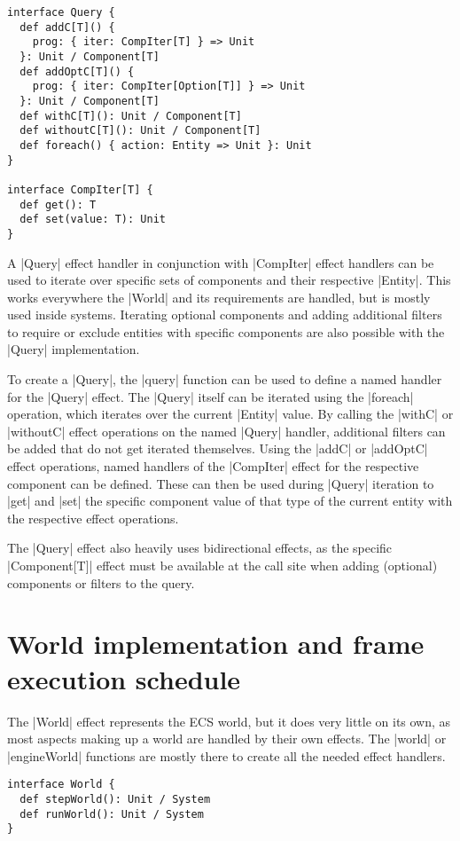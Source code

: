 \begin{lstlisting}[caption=Query and CompIter signitures]
interface Query {
  def addC[T]() {
    prog: { iter: CompIter[T] } => Unit
  }: Unit / Component[T]
  def addOptC[T]() {
    prog: { iter: CompIter[Option[T]] } => Unit
  }: Unit / Component[T]
  def withC[T](): Unit / Component[T]
  def withoutC[T](): Unit / Component[T]
  def foreach() { action: Entity => Unit }: Unit
}

interface CompIter[T] {
  def get(): T
  def set(value: T): Unit
}
\end{lstlisting}

A |Query| effect handler in conjunction with |CompIter| effect handlers can be used to iterate over specific sets of components and their respective |Entity|. This works everywhere the |World| and its requirements are handled, but is mostly used inside systems. Iterating optional components and adding additional filters to require or exclude entities with specific components are also possible with the |Query| implementation.

To create a |Query|, the |query| function can be used to define a named handler for the |Query| effect. The |Query| itself can be iterated using the |foreach| operation, which iterates over the current |Entity| value. By calling the |withC| or |withoutC| effect operations on the named |Query| handler, additional filters can be added that do not get iterated themselves. Using the |addC| or |addOptC| effect operations, named handlers of the |CompIter| effect for the respective component can be defined. These can then be used during |Query| iteration to |get| and |set| the specific component value of that type of the current entity with the respective effect operations.

The |Query| effect also heavily uses bidirectional effects, as the specific |Component[T]| effect must be available at the call site when adding (optional) components or filters to the query.

\section{World implementation and frame execution schedule}

The |World| effect represents the ECS world, but it does very little on its own, as most aspects making up a world are handled by their own effects. The |world| or |engineWorld| functions are mostly there to create all the needed effect handlers.

\begin{lstlisting}[caption=World signiture]
interface World {
  def stepWorld(): Unit / System
  def runWorld(): Unit / System
}
\end{lstlisting}

